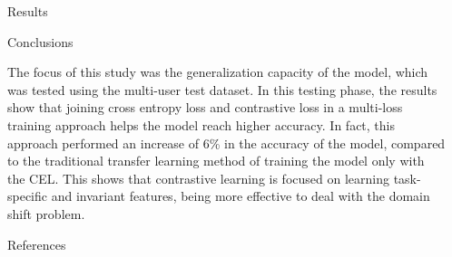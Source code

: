 \documentclass[final]{beamer}
\newlength{\sepwidth}
\newlength{\colwidth}
\newcommand{\separatorcolumn}{\begin{column}{\sepwidth}\end{column}}
\begin{document}
\begin{frame}[t]
\begin{columns}[t]
\begin{column}{\colwidth}
\begin{block}{Results}
  \end{block}

  \begin{block}{Conclusions}

    The focus of this study was the generalization capacity of the model, which was tested using the multi-user
    test dataset. In this testing phase, the results show that joining cross entropy loss and contrastive loss in a
    multi-loss training approach helps the model reach higher accuracy. In fact, this approach
    performed an increase of 6\% in the accuracy of the model, compared to the traditional transfer learning
    method of training the model only with the CEL. This shows that contrastive learning is
    focused on learning task-specific and invariant features, being more effective to deal with the domain shift
    problem.

  \end{block}


  \begin{block}{References}

    \footnotesize{}


  \end{block}

\end{column}

\separatorcolumn
\end{columns}
\end{frame}
\end{document}
